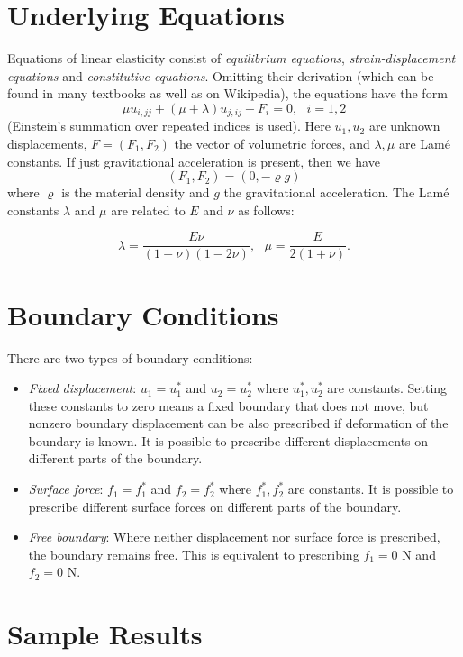 \documentclass{article}
\begin{document}
\section{Underlying Equations}

Equations of linear elasticity consist of {\em equilibrium equations},
{\em strain-displacement equations} and {\em constitutive equations}.
Omitting their derivation (which can be found in many textbooks as well as 
on Wikipedia), the equations have the form 
$$
\mu u_{i, jj} + (\mu + \lambda) u_{j, ij} + F_i = 0, \ \ \ i = 1,2
$$
(Einstein's summation over repeated indices is used). 
Here $u_1, u_2$ are unknown displacements, $F = (F_1, F_2)$ the 
vector of volumetric forces, and $\lambda, \mu$ are Lam\'e constants.
If just gravitational acceleration is present, then we have 
$$
(F_1, F_2) = (0, -\varrho g)
$$
where $\varrho$ is the material density and $g$ the gravitational acceleration.
The Lam\'e constants $\lambda$
and $\mu$ are related to $E$ and $\nu$ as follows:

$$
\lambda = \frac{E \nu}{(1 + \nu)(1 - 2\nu)}, \ \ \ \mu = \frac{E}{2(1 + \nu)}.
$$

\section{Boundary Conditions}

There are two types of boundary conditions:
\begin{itemize}
\item {\em Fixed displacement}: $u_1 = u^*_1$ and $u_2 = u^*_2$ where $u^*_1, u^*_2$ are constants.
      Setting these constants to zero means a fixed boundary that does not move, but nonzero 
      boundary displacement can be also prescribed if deformation of the boundary is known. 
      It is possible to prescribe different displacements on different parts of 
      the boundary. 
\item {\em Surface force}: $f_1 = f^*_1$ and $f_2 = f^*_2$ where $f^*_1, f^*_2$ are constants.
      It is possible to prescribe different surface forces on different parts of 
      the boundary.
\item {\em Free boundary}: Where neither displacement nor surface force is prescribed, the
      boundary remains free. This is equivalent to prescribing $f_1 = 0$ N and $f_2 = 0$ N.
\end{itemize}

\section{Sample Results}
\end{document}
